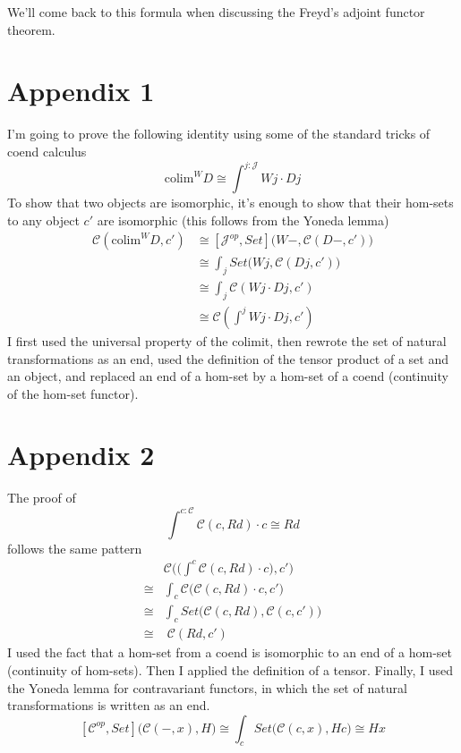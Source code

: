 \documentclass[11pt]{amsart}
\begin{document}
We'll come back to this formula when discussing the Freyd's adjoint functor theorem.

\section{Appendix 1}
I'm going to prove the following identity using some of the standard tricks of coend calculus
\[\mbox{colim}^W D \cong \int^{j \colon \mathcal{J}} W j \cdot D j\]
To show that two objects are isomorphic, it's enough to show that their hom-sets to any object $c'$ are isomorphic (this follows from the Yoneda lemma) 
\[
\begin{aligned}
\mathcal{C}(\mbox{colim}^W D, c') & \cong [\mathcal{J}^{op}, Set]\big(W-, \mathcal{C}(D -, c')\big) \\
 &\cong \int_j Set \big(W j, \mathcal{C}(D j, c')\big) \\
 &\cong \int_j \mathcal{C}(W j \cdot D j, c') \\
 &\cong \mathcal{C}(\int^j W j \cdot D j, c')
\end{aligned} 
\]
I first used the universal property of the colimit, then rewrote the set of natural transformations as an end, used the definition of the tensor product of a set and an object, and replaced an end of a hom-set by a hom-set of a coend (continuity of the hom-set functor).

\section{Appendix 2}
The proof of
\[ \int^{c \colon \mathcal{C}} \mathcal{C}(c, R d) \cdot c \cong R d\]
follows the same pattern
\[
\begin{aligned}
&\mathcal{C}\Big( \big(\int^{c} \mathcal{C}(c, R d) \cdot c\big) , c'\Big)\\
\cong &\int_c \mathcal{C}\big( \mathcal{C}(c, R d) \cdot c , c'\big) \\
\cong &\int_c Set\big( \mathcal{C}(c, R d) , \mathcal{C}(c, c')\big) \\
\cong & \; \mathcal{C}(R d, c') 
\end{aligned}
\]
I used the fact that a hom-set from a coend is isomorphic to an end of a hom-set (continuity of hom-sets). Then I applied the definition of a tensor. Finally, I used the Yoneda lemma for contravariant functors, in which the set of natural transformations is written as an end. 
\[ [ \mathcal{C}^{op}, Set]\big(\mathcal{C}(-, x), H \big) \cong \int_c Set \big( \mathcal{C}(c, x), H c \big) \cong H x\]
\end{document}
